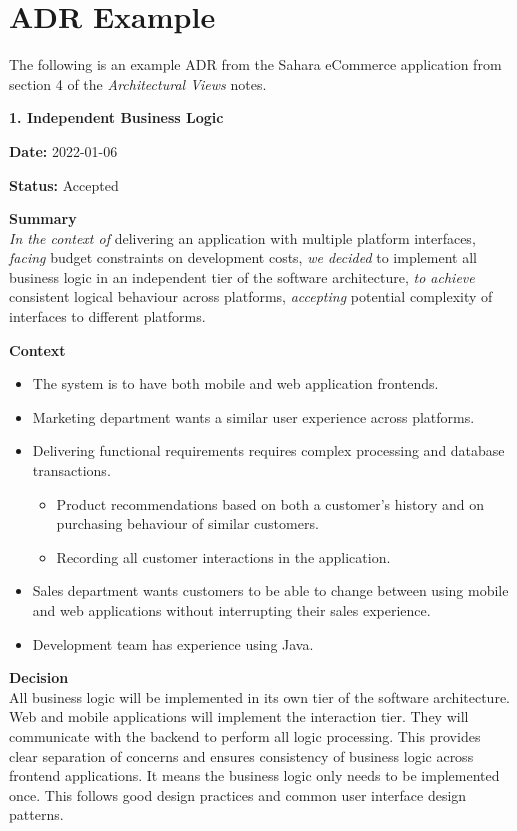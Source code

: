 \section{ADR Example}
The following is an example ADR from the Sahara eCommerce application from section 4 of the \textit{Architectural Views} notes.
\newline

\noindent\textbf{1. Independent Business Logic}

\noindent\textbf{Date:} 2022-01-06

\noindent\textbf{Status:} Accepted

\noindent\textbf{Summary}\\
\emph{In the context of} delivering an application with multiple platform interfaces,  
\emph{facing} budget constraints on development costs,  
\emph{we decided} to implement all business logic in an independent tier of the software architecture,  
\emph{to achieve} consistent logical behaviour across platforms,  
\emph{accepting} potential complexity of interfaces to different platforms.

\noindent\textbf{Context}
\begin{itemize}[noitemsep,nolistsep]
    \item The system is to have both mobile and web application frontends.
    \item Marketing department wants a similar user experience across platforms.
    \item Delivering functional requirements requires complex processing and database transactions.
    \begin{itemize}[noitemsep,nolistsep]
        \item Product recommendations based on both a customer's history and on purchasing behaviour of similar customers.
        \item Recording all customer interactions in the application.
    \end{itemize}
    \item Sales department wants customers to be able to change between using mobile and web applications without interrupting their sales experience.
    \item Development team has experience using Java.
\end{itemize}

\noindent\textbf{Decision}\\
All business logic will be implemented in its own tier of the software architecture.
Web and mobile applications will implement the interaction tier.
They will communicate with the backend to perform all logic processing.
This provides clear separation of concerns and ensures consistency of business logic across frontend applications.
It means the business logic only needs to be implemented once.
This follows good design practices and common user interface design patterns.

